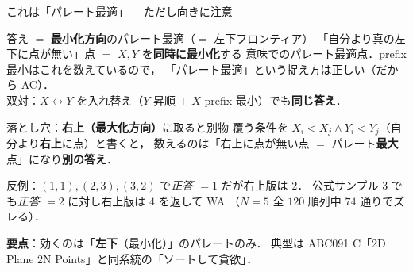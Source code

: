 \documentclass[dvipdfmx,aspectratio=169]{beamer}
\begin{document}
\begin{frame}{これは「パレート最適」— ただし\underline{向き}に注意}
  \begin{block}{答え $=$ \textbf{最小化方向}のパレート最適（$=$ 左下フロンティア）}
    「自分より真の左下に点が無い」点 $=$ $X,Y$ を\textbf{同時に最小化}する
    意味でのパレート最適点．prefix 最小はこれを数えているので，
    \textcolor{ok}{「パレート最適」という捉え方は正しい（だから AC）}．
    \\[0.2em]
    双対：$X{\leftrightarrow}Y$ を入れ替え（$Y$ 昇順 $+$ $X$ prefix 最小）でも\textbf{同じ答え}．
  \end{block}

  \begin{alertblock}{落とし穴：\textbf{右上（最大化方向）}に取ると別物}
    覆う条件を $X_i<X_j \wedge Y_i<Y_j$（自分より\textbf{右上}に点）と書くと，
    数えるのは「右上に点が無い点 $=$ パレート\textbf{最大}点」になり\textbf{別の答え}．
  \end{alertblock}

  \footnotesize 反例：$(1,1),(2,3),(3,2)$ で\emph{正答 $=1$} だが右上版は $2$．
  公式サンプル $3$ でも\emph{正答 $=2$} に対し右上版は $4$ を返して WA
  （$N=5$ 全 $120$ 順列中 $74$ 通りでズレる）．
  \normalsize

  \vspace{0.3em}
  \textbf{要点}：効くのは「\textbf{左下}（最小化）」のパレートのみ．
  典型は ABC091 C「2D Plane 2N Points」と同系統の「ソートして貪欲」．
\end{frame}
\end{document}
